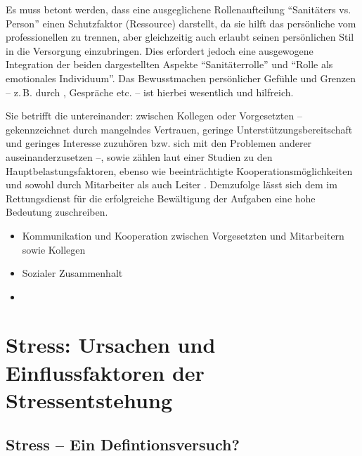 {Es muss betont werden, dass eine ausgeglichene
Rollenaufteilung \enquote{Sanitäters vs. Person} einen
Schutzfaktor (Ressource) darstellt, da sie hilft das persönliche vom
professionellen zu trennen, aber gleichzeitig auch erlaubt
seinen persönlichen Stil in die Versorgung
einzubringen. Dies erfordert jedoch eine ausgewogene
Integration der beiden dargestellten Aspekte
\enquote{Sanitäterrolle} und \enquote{Rolle als emotionales Individuum}.
Das Bewusstmachen persönlicher Gefühle und Grenzen -- z.\,B.
durch , Gespräche etc. -- ist hierbei
wesentlich und hilfreich.}
{}
{}
{}
{}



{Sie betrifft die 
untereinander: 
zwischen Kollegen oder Vorgesetzten – gekennzeichnet durch
mangelndes Vertrauen, geringe Unterstützungsbereitschaft und
geringes Interesse zuzuhören bzw. sich mit den Problemen
anderer auseinanderzusetzen –,  sowie
 zählen laut
einer Studien zu den
Hauptbelastungsfaktoren, ebenso wie beeinträchtigte
Kooperationsmöglichkeiten und 
sowohl durch Mitarbeiter als auch Leiter . Demzufolge
lässt sich dem  im Rettungsdienst
für die
erfolgreiche Bewältigung der Aufgaben eine hohe Bedeutung
zuschreiben.}
{
\begin{itemize}
  \item Kommunikation und Kooperation zwischen
  Vorgesetzten und Mitarbeitern sowie Kollegen
  \item Sozialer Zusammenhalt
  \item
\end{itemize}
}
{}
{}
{}








\section{Stress: Ursachen und Einflussfaktoren der Stressentstehung}

\label{topic:stress-ursachen}

\subsection{Stress -- Ein Defintionsversuch?}

